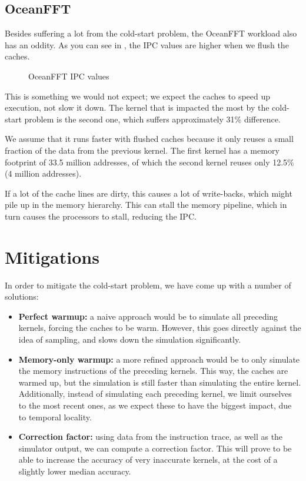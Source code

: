 \documentclass[5p,numvwe]{elsarticle}
\begin{document}
    \subsection{OceanFFT}\label{subsec:oceanfft}
    Besides suffering a lot from the cold-start problem, the OceanFFT workload also has an oddity.
    As you can see in , the IPC values are higher when we flush the caches.

    \begin{figure}[ht]
        \centering
        \caption{OceanFFT IPC values}
        \label{fig:sim-ocean}
    \end{figure}

    This is something we would not expect; we expect the caches to speed up execution, not slow it down.
    The kernel that is impacted the most by the cold-start problem is the second one, which suffers approximately 31\% difference.

    We assume that it runs faster with flushed caches because it only reuses a small fraction of the data from the previous kernel.
    The first kernel has a memory footprint of 33.5 million addresses, of which the second kernel reuses only 12.5\% (4 million addresses).

    If a lot of the cache lines are dirty, this causes a lot of write-backs, which might pile up in the memory hierarchy.
    This can stall the memory pipeline, which in turn causes the processors to stall, reducing the IPC\@.

    \section{Mitigations}\label{sec:mitig} %
    In order to mitigate the cold-start problem, we have come up with a number of solutions:
    \begin{itemize}
        \item \textbf{Perfect warmup:} a naive approach would be to simulate all preceding kernels, forcing the caches to be warm.
        However, this goes directly against the idea of sampling, and slows down the simulation significantly.
        \item \textbf{Memory-only warmup:} a more refined approach would be to only simulate the memory instructions of the preceding kernels.
        This way, the caches are warmed up, but the simulation is still faster than simulating the entire kernel.
        Additionally, instead of simulating each preceding kernel, we limit ourselves to the most recent ones, as we expect these to have the biggest impact, due to temporal locality.
        \item \textbf{Correction factor:} using data from the instruction trace, as well as the simulator output, we can compute a correction factor.
        This will prove to be able to increase the accuracy of very inaccurate kernels, at the cost of a slightly lower median accuracy.
    \end{itemize}
\end{document}
